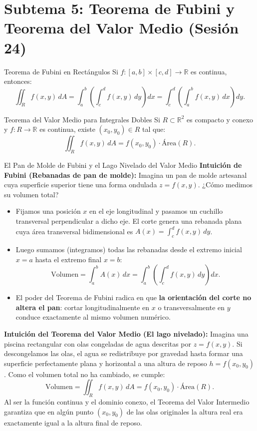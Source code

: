 \documentclass[11pt,a4paper]{article}
\begin{document}
\section{Subtema 5: Teorema de Fubini y Teorema del Valor Medio (Sesión 24)}

\begin{theorempage}{Teorema de Fubini en Rectángulos}
Si $f: [a,b] \times [c,d] \to \mathbb{R}$ es continua, entonces:
\[
\iint_R f(x,y) \, dA = \int_a^b \left( \int_c^d f(x,y) \, dy \right) dx = \int_c^d \left( \int_a^b f(x,y) \, dx \right) dy.
\]
\end{theorempage}

\begin{theorempage}{Teorema del Valor Medio para Integrales Dobles}
Si $R \subset \mathbb{R}^2$ es compacto y conexo y $f: R \to \mathbb{R}$ es continua, existe $(x_0, y_0) \in R$ tal que:
\[
\iint_R f(x,y) \, dA = f(x_0, y_0) \cdot \text{Área}(R).
\]
\end{theorempage}

\begin{intuitionbox}{El Pan de Molde de Fubini y el Lago Nivelado del Valor Medio}
\textbf{Intuición de Fubini (Rebanadas de pan de molde):} Imagina un pan de molde artesanal cuya superficie superior tiene una forma ondulada $z = f(x,y)$. ¿Cómo medimos su volumen total?
\begin{itemize}[noitemsep]
    \item Fijamos una posición $x$ en el eje longitudinal y pasamos un cuchillo transversal perpendicular a dicho eje. El corte genera una rebanada plana cuya área transversal bidimensional es $A(x) = \int_c^d f(x,y) \, dy$.
    \item Luego sumamos (integramos) todas las rebanadas desde el extremo inicial $x=a$ hasta el extremo final $x=b$:
    \[
    \text{Volumen} = \int_a^b A(x) \, dx = \int_a^b \left( \int_c^d f(x,y) \, dy \right) dx.
    \]
    \item El poder del Teorema de Fubini radica en que \textbf{la orientación del corte no altera el pan}: cortar longitudinalmente en $x$ o transversalmente en $y$ conduce exactamente al mismo volumen numérico.
\end{itemize}

\textbf{Intuición del Teorema del Valor Medio (El lago nivelado):} Imagina una piscina rectangular con olas congeladas de agua descritas por $z = f(x,y)$. Si descongelamos las olas, el agua se redistribuye por gravedad hasta formar una superficie perfectamente plana y horizontal a una altura de reposo $h = f(x_0, y_0)$. Como el volumen total no ha cambiado, se cumple:
\[
\text{Volumen} = \iint_R f(x,y) \, dA = f(x_0, y_0) \cdot \text{Área}(R).
\]
Al ser la función continua y el dominio conexo, el Teorema del Valor Intermedio garantiza que en algún punto $(x_0, y_0)$ de las olas originales la altura real era exactamente igual a la altura final de reposo.
\end{intuitionbox}
\end{document}
